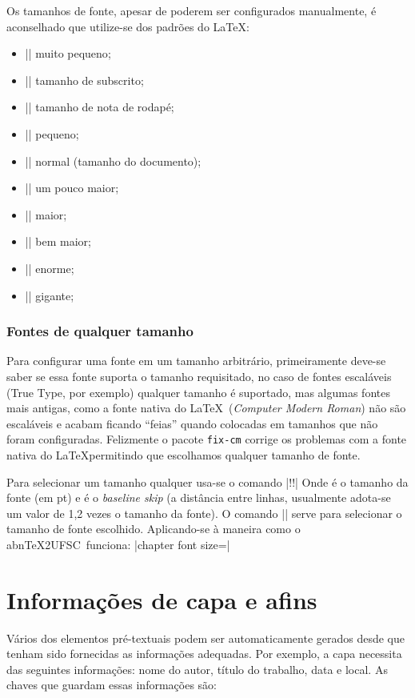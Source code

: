 \documentclass[openright]{memoir}
\newcommand*{\abntexUFSC}{abn\TeX2UFSC}
\newcommand{\emingles}[1]{\foreignlanguage{english}{\textit{#1}}}
\begin{document}
Os tamanhos de fonte, apesar de poderem ser configurados manualmente, é aconselhado que utilize-se dos padrões do \LaTeX:

\begin{itemize}
\item \code|\tiny| {\tiny muito pequeno};
\item \code|\scriptsize| {\scriptsize tamanho de subscrito};
\item \code|\footnotesize| {\footnotesize tamanho de nota de rodapé};
\item \code|\small| {\small pequeno};
\item \code|\normalsize| {\normalsize normal} (tamanho do documento);
\item \code|\large| {\large um pouco maior};
\item \code|\Large| {\Large maior};
\item \code|\LARGE| {\LARGE bem maior};
\item \code|\huge| {\huge enorme};
\item \code|\Huge| {\Huge gigante};
\end{itemize}

\subsubsection{Fontes de qualquer tamanho}
\label{fonte-qualquer}

Para configurar uma fonte em um tamanho arbitrário, primeiramente deve-se saber se essa fonte suporta o tamanho requisitado, no caso de fontes escaláveis (True Type, por exemplo) qualquer tamanho é suportado, mas algumas fontes mais antigas, como a fonte nativa do \LaTeX\ (\emph{Computer Modern Roman}) não são escaláveis e acabam ficando ``feias'' quando colocadas em tamanhos que não foram configuradas. Felizmente o pacote \texttt{fix-cm} corrige os problemas com a fonte nativa do \LaTeX permitindo que escolhamos qualquer tamanho de fonte.

Para selecionar um tamanho qualquer usa-se o comando \displaycode|\fontesize!!\selectfont| Onde  é o tamanho da fonte (em pt) e  é o \emingles{baseline skip} (a distância entre linhas, usualmente adota-se um valor de 1,2 vezes o tamanho da fonte). O comando \code|\selectfont| serve para selecionar o tamanho de fonte escolhido. Aplicando-se à maneira como o \abntexUFSC\ funciona: \displaycode|chapter font size={\fontsize{16pt}{19.2pt}\selectfont}|
\section{Informações de capa e afins}
Vários dos elementos pré-textuais podem ser automaticamente gerados desde que tenham sido fornecidas as informações adequadas. Por exemplo, a capa necessita das seguintes informações: nome do autor, título do trabalho, data e local. As chaves que guardam essas informações são:
\end{document}
